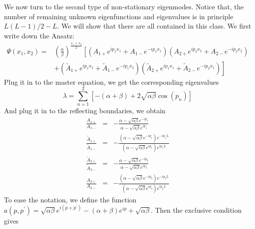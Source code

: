 \documentclass[12pt,a4paper]{article}
\begin{document}
We now turn to the second type of non-stationary eigenmodes. Notice that, the
number of remaining unknown eigenfunctions and eigenvalues is in principle
$L(L-1)/2 - L$. We will show that there are all contained in this class. We
first write down the Ansatz:
\begin{equation}
    \label{eq:nonstationaryModesTwo2}
    \begin{aligned}
        \Psi(x_1, x_2) = &  \left(\frac{\alpha}{\beta}\right)^{\frac{x_1+x_2}{2}} 
        \left[\left( A_{1+} e^{ip_1 x_1} + A_{1-} e^{-ip_1 x_1}\right)  
            \left( A_{2+} e^{ip_2 x_2} + A_{2-} e^{-ip_2 x_2}\right) \right.\\
        & \left. + \left( \tilde{A}_{1+} e^{ip_1 x_2} + \tilde{A}_{1-} e^{-ip_1
                    x_2}\right)  \left( \tilde{A}_{2+} e^{ip_1 x_1} +
                \tilde{A}_{2-} e^{-ip_2 x_1}\right) \right]
    \end{aligned}
\end{equation}
Plug it in to the master equation, we get the corresponding eigenvalues
\begin{equation}
    \label{eq:eigenvaluesTwo2}
    \lambda = \sum_{n=1}^2\left[-(\alpha+\beta) + 
        2\sqrt{\alpha\beta}\cos(p_n)\right]
\end{equation} 
And plug it in to the reflecting boundaries, we obtain
\begin{subequations}
    \label{eq:scatterFactorBoundary2}
    \begin{eqnarray}
        \frac{A_{1+}}{A_{1-}} & = & -\frac{\alpha-\sqrt{\alpha\beta}
                e^{-ip_1}}{\alpha-\sqrt{\alpha\beta} e^{ip_1}}  \\
        \frac{\tilde{A}_{1+}}{\tilde{A}_{1-}} & = & 
        -\frac{\left(\alpha-\sqrt{\alpha\beta} e^{-ip_1}\right) e^{-ip_1L}}
        {\left(\alpha-\sqrt{\alpha\beta} e^{ip_1}\right) e^{ip_1L}}  \\
        \frac{\tilde{A}_{2+}}{\tilde{A}_{2-}} & = & -\frac{\alpha -
            \sqrt{\alpha\beta} e^{-ip_2}}{\alpha-\sqrt{\alpha\beta} e^{ip_2}}\\
        \frac{A_{2+}}{A_{2-}} & = & -\frac{\left(\alpha-\sqrt{\alpha\beta}
                e^{-ip_2}\right) e^{-ip_2L}}{\left(\alpha-\sqrt{\alpha\beta} 
                e^{ip_2}\right) e^{ip_2L}}
    \end{eqnarray}
\end{subequations}
To ease the notation, we define the function $a(p, p^\prime) =
\sqrt{\alpha\beta}e^{i(p+p^\prime)}-(\alpha+\beta)e^{ip}+\sqrt{\alpha\beta}$.
Then the exclusive condition gives 
\end{document}
